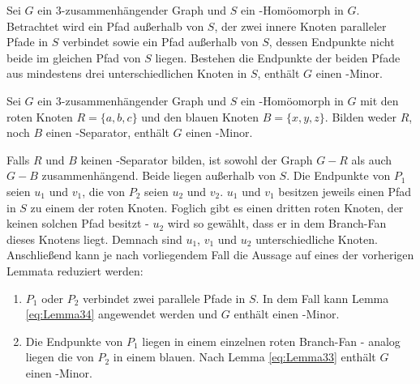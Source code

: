 \begin{lemma}\label{eq:Lemma34}
  Sei $G$ ein $3$-zusammenhängender Graph und $S$ ein \kdd-Homöomorph in $G$.
  Betrachtet wird ein Pfad außerhalb von $S$, der zwei innere Knoten paralleler Pfade in $S$ verbindet sowie ein Pfad außerhalb von $S$, dessen Endpunkte nicht beide im gleichen Pfad von $S$ liegen.
  Bestehen die Endpunkte der beiden Pfade aus mindestens drei unterschiedlichen Knoten in $S$, enthält $G$ einen \kf-Minor.
\end{lemma}

\begin{lemma}\label{eq:Lemma35}
  Sei $G$ ein $3$-zusammenhängender Graph und $S$ ein \kdd-Homöomorph in $G$ mit den roten Knoten $R = \{a, b, c\}$ und den blauen Knoten $B = \{x, y, z\}$.
  Bilden weder $R$, noch $B$ einen \dd-Separator, enthält $G$ einen \kf-Minor.
\end{lemma}
\begin{beweis}
  Falls $R$ und $B$ keinen \dd-Separator bilden, ist sowohl der Graph $G - R$ als auch $G - B$ zusammenhängend.
  Beide liegen außerhalb von $S$.
  Die Endpunkte von $P_1$ seien $u_1$ und $v_1$, die von $P_2$ seien $u_2$ und $v_2$.
  $u_1$ und $v_1$ besitzen jeweils einen Pfad in $S$ zu einem der roten Knoten.
  Foglich gibt es einen dritten roten Knoten, der keinen solchen Pfad besitzt - $u_2$ wird so gewählt, dass er in dem Branch-Fan dieses Knotens liegt.
  Demnach sind $u_1$, $v_1$ und $u_2$ unterschiedliche Knoten.
  Anschließend kann je nach vorliegendem Fall die Aussage auf eines der vorherigen Lemmata reduziert werden:
  \begin{enumerate}
    \item $P_1$ oder $P_2$ verbindet zwei parallele Pfade in $S$.
          In dem Fall kann Lemma \ref{eq:Lemma34} angewendet werden und $G$ enthält einen \kf-Minor.
    \item Die Endpunkte von $P_1$ liegen in einem einzelnen roten Branch-Fan - analog liegen die von $P_2$ in einem blauen.
          Nach Lemma \ref{eq:Lemma33} enthält $G$ einen \kf-Minor.
  \end{enumerate}
\end{beweis}


